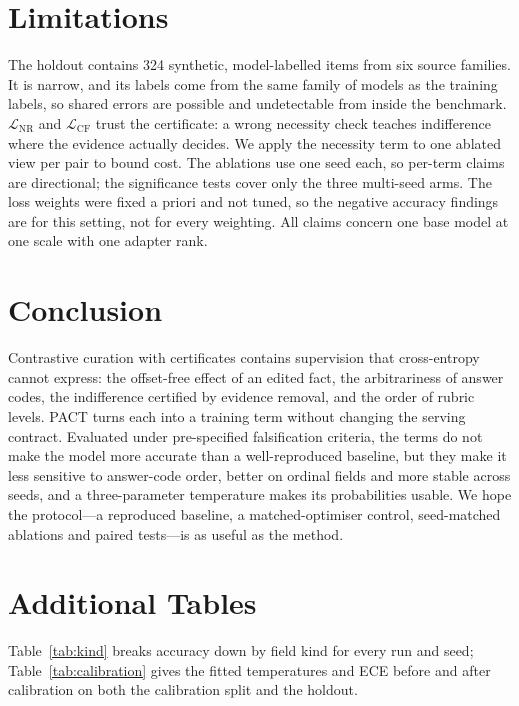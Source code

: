 \documentclass[conference]{IEEEtran}
\newcommand{\Lcf}{\mathcal{L}_{\mathrm{CF}}}
\newcommand{\Lnr}{\mathcal{L}_{\mathrm{NR}}}
\begin{document}
\section{Limitations}
\label{sec:limits}
The holdout contains 324 synthetic, model-labelled items from six source
families. It is narrow, and its labels come from the same family of models as
the training labels, so shared errors are possible and undetectable from inside
the benchmark. $\Lnr$ and $\Lcf$ trust the certificate: a wrong necessity check
teaches indifference where the evidence actually decides. We apply the
necessity term to one ablated view per pair to bound cost. The ablations use one
seed each, so per-term claims are directional; the significance tests cover only
the three multi-seed arms. The loss weights were fixed a priori and not tuned,
so the negative accuracy findings are for this setting, not for every weighting.
All claims concern one base model at one scale with one adapter rank.

\section{Conclusion}
\label{sec:conclusion}
Contrastive curation with certificates contains supervision that cross-entropy
cannot express: the offset-free effect of an edited fact, the arbitrariness of
answer codes, the indifference certified by evidence removal, and the order of
rubric levels. PACT turns each into a training term without changing the
serving contract. Evaluated under pre-specified falsification criteria, the
terms do not make the model more accurate than a well-reproduced baseline, but
they make it less sensitive to answer-code order, better on ordinal fields and
more stable across seeds, and a three-parameter temperature makes its
probabilities usable. We hope the protocol---a reproduced baseline, a
matched-optimiser control, seed-matched ablations and paired tests---is as
useful as the method.




\appendices

\section{Additional Tables}
\label{app:tables}
Table~\ref{tab:kind} breaks accuracy down by field kind for every run and
seed; Table~\ref{tab:calibration} gives the fitted temperatures and ECE before
and after calibration on both the calibration split and the holdout.
\end{document}
